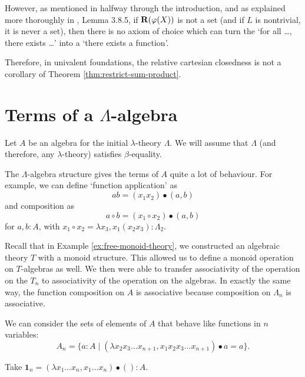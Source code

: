 \begin{remark}
  However, as mentioned in \cite{univalent-categories} halfway through the introduction, and as explained more thoroughly in \cite{hottbook}, Lemma 3.8.5, if $ \mathbf{R}(\varphi(X)) $ is not a set (and if $ L $ is nontrivial, it is never a set), then there is no axiom of choice which can turn the `for all \dots, there exists \dots' into a `there exists a function'.

  Therefore, in univalent foundations, the relative cartesian closedness is not a corollary of Theorem \ref{thm:restrict-sum-product}.
\end{remark}

\section{Terms of a \texorpdfstring{$ \Lambda $}{Lambda}-algebra}
Let $ A $ be an algebra for the initial $ \lambda $-theory $ \Lambda $. We will assume that $ \Lambda $ (and therefore, any $ \lambda $-theory) satisfies $ \beta $-equality.

The $ \Lambda $-algebra structure gives the terms of $ A $ quite a lot of behaviour. For example, we can define `function application' as
\[ a b = (x_1 x_2) \bullet (a, b) \]
and composition as
\[ a \circ b = (x_1 \circ x_2) \bullet (a, b) \]
for $ a, b : A $, with $ x_1 \circ x_2 = \lambda x_3, x_1 (x_2 x_3) : \Lambda_2 $.

\begin{remark}
  Recall that in Example \ref{ex:free-monoid-theory}, we constructed an algebraic theory $ T $ with a monoid structure. This allowed us to define a monoid operation on $ T $-algebras as well. We then were able to transfer associativity of the operation on the $ T_n $ to associativity of the operation on the algebras. In exactly the same way, the function composition on $ A $ is associative because composition on $ \Lambda_n $ is associative.
\end{remark}

\begin{definition}
  We can consider the sets of elements of $ A $ that behave like functions in $ n $ variables:
  \[ A_n = \{ a : A \mid (\lambda x_2 x_3 \dots x_{n + 1}, x_1 x_2 x_3 \dots x_{n + 1}) \bullet a = a \}. \]
\end{definition}

\begin{definition}
  Take $ \mathbf 1_n = (\lambda x_1 \dots x_n, x_1 \dots x_n) \bullet () : A $.
\end{definition}

